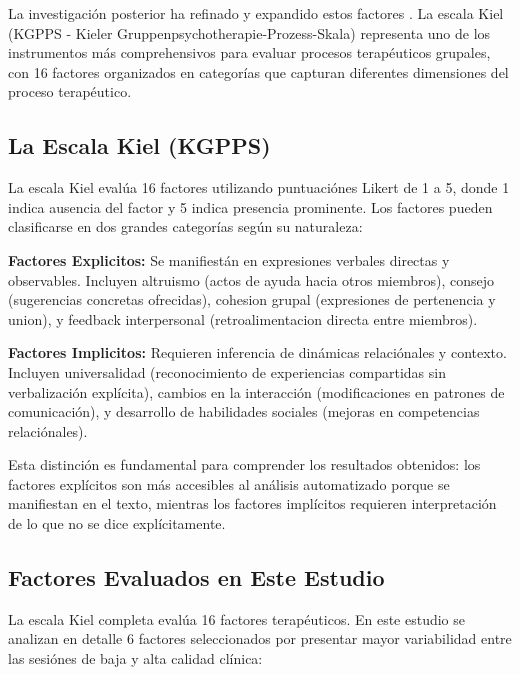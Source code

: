 \documentclass[12pt,a4paper,twoside]{book}
\begin{document}
La investigación posterior ha refinado y expandido estos factores \cite{burlingame2004small, piper2005evidence}. La escala Kiel (KGPPS - Kieler Gruppenpsychotherapie-Prozess-Skala) \cite{rohweder1993} representa uno de los instrumentos más comprehensivos para evaluar procesos terapéuticos grupales, con 16 factores organizados en categorías que capturan diferentes dimensiones del proceso terapéutico.

\subsection{La Escala Kiel (KGPPS)}

La escala Kiel evalúa 16 factores utilizando puntuaciónes Likert de 1 a 5, donde 1 indica ausencia del factor y 5 indica presencia prominente. Los factores pueden clasificarse en dos grandes categorías según su naturaleza:

\textbf{Factores Explicitos:} Se manifiestán en expresiones verbales directas y observables. Incluyen altruismo (actos de ayuda hacia otros miembros), consejo (sugerencias concretas ofrecidas), cohesion grupal (expresiones de pertenencia y union), y feedback interpersonal (retroalimentacion directa entre miembros).

\textbf{Factores Implicitos:} Requieren inferencia de dinámicas relaciónales y contexto. Incluyen universalidad (reconocimiento de experiencias compartidas sin verbalización explícita), cambios en la interacción (modificaciones en patrones de comunicación), y desarrollo de habilidades sociales (mejoras en competencias relaciónales).

Esta distinción es fundamental para comprender los resultados obtenidos: los factores explícitos son más accesibles al análisis automatizado porque se manifiestan en el texto, mientras los factores implícitos requieren interpretación de lo que no se dice explícitamente.

\subsection{Factores Evaluados en Este Estudio}

La escala Kiel completa evalúa 16 factores terapéuticos. En este estudio se analizan en detalle 6 factores seleccionados por presentar mayor variabilidad entre las sesiónes de baja y alta calidad clínica:
\end{document}
